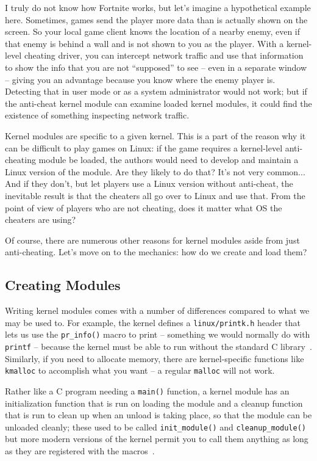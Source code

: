 I truly do not know how Fortnite works, but let's imagine a hypothetical example here. Sometimes, games send the player more data than is actually shown on the screen. So your local game client knows the location of a nearby enemy, even if that enemy is behind a wall and is not shown to you as the player. With a kernel-level cheating driver, you can intercept network traffic and use that information to show the info that you are not ``supposed'' to see -- even in a separate window -- giving you an advantage because you know where the enemy player is. Detecting that in user mode or as a system administrator would not work; but if the anti-cheat kernel module can examine loaded kernel modules, it could find the existence of something inspecting network traffic.

Kernel modules are specific to a given kernel. This is a part of the reason why it can be difficult to play games on Linux: if the game requires a kernel-level anti-cheating module be loaded, the authors would need to develop and maintain a Linux version of the module. Are they likely to do that? It's not very common... And if they don't, but let players use a Linux version without anti-cheat, the inevitable result is that the cheaters all go over to Linux and use that. From the point of view of players who are not cheating, does it matter what OS the cheaters are using? 

Of course, there are numerous other reasons for kernel modules aside from just anti-cheating. Let's move on to the mechanics: how do we create and load them?

\subsection*{Creating Modules}

Writing kernel modules comes with a number of differences compared to what we may be used to. For example, the kernel defines a \texttt{linux/printk.h} header that lets us use the \texttt{pr\_info()} macro to print -- something we would normally do with \texttt{printf} -- because the kernel must be able to run without the standard C library~\cite{corbet2005linux}. Similarly, if you need to allocate memory, there are kernel-specific functions like \texttt{kmalloc} to accomplish what you want -- a regular \texttt{malloc} will not work. 

Rather like a C program needing a \texttt{main()} function, a kernel module has an initialization function that is run on loading the module and a cleanup function that is run to clean up when an unload is taking place, so that the module can be unloaded cleanly; these used to be called \texttt{init\_module()} and \texttt{cleanup\_module()} but more modern versions of the kernel permit you to call them anything as long as they are registered with the macros~\cite{pomerantz2000lkmpg}. 

